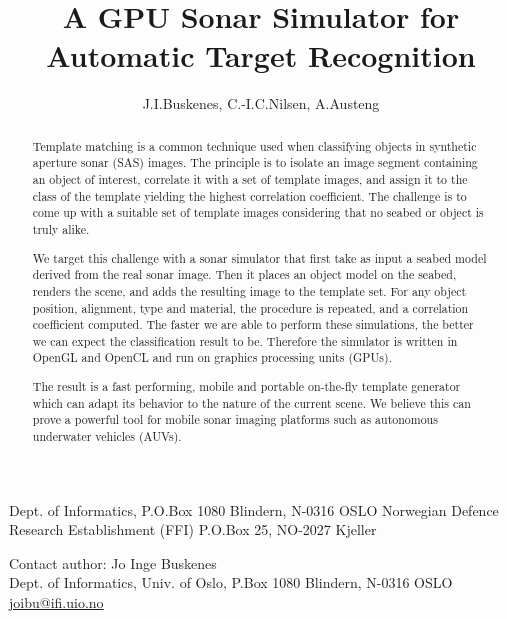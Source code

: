 \documentclass[
   UAM                                          %
 , 12pt                                         %
 , bibtex                                       %
 , layout
]{common/mytemplate}
\begin{document}
% 

\pagestyle{plain}



\title{A GPU Sonar Simulator for Automatic Target Recognition}%
%
\author{J.I.Buskenes\firstAddress, C.-I.C.Nilsen\secondAddress, A.Austeng\secondAddress}%
%
\begin{contact}
  \firstAddress Dept. of Informatics, P.O.Box 1080 Blindern, N-0316 OSLO
  \secondAddress Norwegian Defence Research Establishment (FFI) P.O.Box 25, NO-2027 Kjeller
\end{contact}%
%
\begin{contact}
Contact author: Jo Inge Buskenes\\
Dept. of Informatics, Univ. of Oslo, P.Box 1080 Blindern, N-0316 OSLO\\
\href{mailto:joibu@ifi.uio.no}{joibu@ifi.uio.no}
\end{contact}%
%
\begin{abstract}
Template matching is a common technique used when classifying objects in synthetic aperture sonar (SAS) images. The principle is to isolate an image segment containing an object of interest, correlate it with a set of template images, and assign it to the class of the template yielding the highest correlation coefficient. The challenge is to come up with a suitable set of template images considering that no seabed or object is truly alike.

We target this challenge with a sonar simulator that first take as input a seabed model derived from the real sonar image. Then it places an object model on the seabed, renders the scene, and adds the resulting image to the template set. For any object position, alignment, type and material, the procedure is repeated, and a correlation coefficient computed. The faster we are able to perform these simulations, the better we can expect the classification result to be. Therefore the simulator is written in OpenGL and OpenCL and run on graphics processing units (GPUs).

The result is a fast performing, mobile and portable on-the-fly template generator which can adapt its behavior to the nature of the current scene. We believe this can prove a powerful tool for mobile sonar imaging platforms such as autonomous underwater vehicles (AUVs).
\end{abstract}%
%
\end{document}
